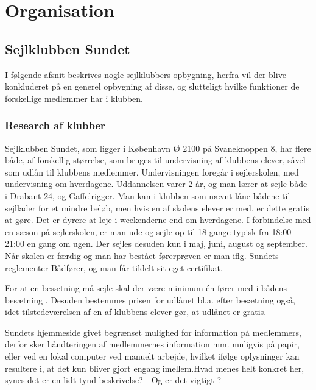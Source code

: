 \chapter{Organisation}\label{chap:organisation}

\cbstart

\section{Sejlklubben Sundet}

I følgende afsnit beskrives nogle sejlklubbers opbygning, herfra vil der blive konkluderet på en generel opbygning af
disse, og slutteligt hvilke funktioner de forskellige medlemmer har i klubben.

\subsection{Research af klubber}\label{subsec:research}


Sejlklubben Sundet, som ligger i København Ø 2100 på Svaneknoppen 8, har flere både, af forskellig størrelse, som bruges
til undervisning af klubbens elever, såvel som udlån til klubbens medlemmer. Undervisningen foregår i sejlerskolen, med
undervisning om hverdagene. Uddannelsen varer 2 år, og man lærer at sejle både i Drabant 24, og Gaffelrigger. Man kan i
klubben som nævnt låne bådene til sejllader for et mindre beløb, men hvis en af skolens elever er med, er dette gratis
at gøre. Det er dyrere at leje i weekenderne end om hverdagene. I forbindelse med en sæson på sejlerskolen, er man ude
og sejle op til 18 gange typisk fra 18:00-21:00 en gang om ugen. Der sejles desuden kun i maj, juni, august og
september. Når skolen er færdig og man har bestået førerprøven er man iflg. Sundets reglementer Bådfører, og man får
tildelt sit eget certifikat.

For at en besætning må sejle skal der være minimum én fører med i bådens besætning . Desuden bestemmes prisen for udlånet bl.a. efter besætning også, idet tilstedeværelsen af en af klubbens elever
gør, at udlånet er gratis.\citep{Sundet}

Sundets hjemmeside givet begrænset mulighed for information på medlemmers, derfor sker håndteringen af medlemmernes
information mm. muligvis på papir, eller ved en lokal computer ved manuelt arbejde, hvilket ifølge oplysninger
 kan resultere i, at det kun bliver gjort engang imellem.{Hvad menes
helt konkret her, synes det er en lidt tynd beskrivelse? - Og er det vigtigt ? }

